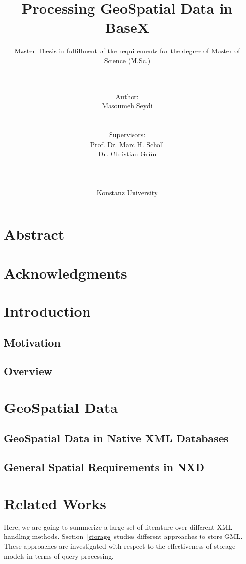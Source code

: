 \documentclass[a4paper,12pt]{article}
\title{Processing GeoSpatial Data in BaseX}
\subtitle{Master Thesis in fulfillment of the requirements for the degree of
Master of Science (M.Sc.)}
\author{\\\\Author: \\
	Masoumeh Seydi
	\\\\\\Supervisors: \\
	Prof. Dr. Marc H. Scholl \\ 
	Dr. Christian Gr{\"u}n \\
	\\\\\\
	Konstanz University}
\begin{document}
\maketitle
\thispagestyle{empty}

\newpage
\section*{Abstract}

\thispagestyle{empty}

\newpage
\section*{Acknowledgments}

\thispagestyle{empty}

\newpage
\tableofcontents

\thispagestyle{empty}
\newpage
\section{Introduction}
\setcounter{page}{1}

\subsection{Motivation}

\subsection{Overview}

\newpage
\section{GeoSpatial Data}

\subsection{GeoSpatial Data in Native XML Databases}

\subsection{General Spatial Requirements in NXD}
\newpage

\section{Related Works}
Here, we are going to summerize a large set of literature
over different XML handling methods. Section~\ref{storage} studies
different approaches to store GML. These approaches are investigated
with respect to the effectiveness of storage models in terms of query processing.
  
\end{document}
